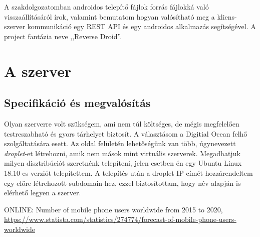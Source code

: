 \documentclass{thesis-ekf}             %
\theoremstyle{definition}
\theoremstyle{remark}
\begin{document}
A szakdolgozatomban androidos telepítő  fájlok forrás fájlokká való visszaállításáról írok, valamint bemutatom hogyan valósítható meg a kliens-szerver kommunikáció egy REST API és egy androidos alkalmazás segítségével. A project fantázia neve ,,Reverse Droid''.


\chapter{A szerver }\label{szerver}
\section{Specifikáció és megvalósítás}

Olyan szerverre volt szükségem, ami nem túl költséges, de mégis megfelelően testreszabható és gyors tárhelyet biztosít. A választásom a Digitial Ocean felhő szolgáltatására esett. Az oldal felületén lehetőségünk van több, úgynevezett \emph{droplet}-et létrehozni, amik nem mások mint virtuális szerverek. Megadhatjuk milyen disztribúciót szeretnénk telepíteni, jelen esetben én egy Ubuntu Linux 18.10-es verziót telepítettem. A telepítés után a droplet IP címét hozzárendeltem egy előre létrehozott subdomain-hez, ezzel biztosítottam, hogy név alapján is elérhető legyen a szerver.


\begin{thebibliography}{1}
 \textsc{ONLINE}: Number of mobile phone users worldwide from 2015 to 2020, \url{https://www.statista.com/statistics/274774/forecast-of-mobile-phone-users-worldwide}
\end{thebibliography}
\end{document}
